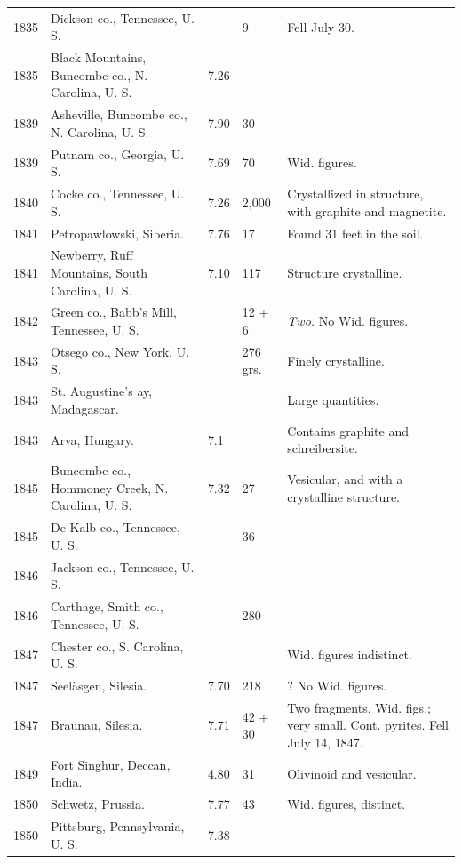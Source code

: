 \documentclass[a4paper, 12pt, oneside]{article}
\begin{document}
\begin{center}
\begin{longtable}{|p{16mm}|p{34mm}|p{10mm}|p{12mm}|p{40mm}|}
        1835 & Dickson co., Tennessee, U. S. & ~ & 9 & Fell July 30. \\
        1835 & Black Mountains, Buncombe co., N. Carolina, U. S. & 7.26 & ~ & ~ \\
        1839 & Asheville, Buncombe co., N. Carolina, U. S. & 7.90 & 30 & ~ \\
        1839 & Putnam co., Georgia, U. S. & 7.69 & 70 & Wid. figures. \\
        1840 & Cocke co., Tennessee, U. S. & 7.26 & 2,000 & Crystallized in structure, with graphite and magnetite. \\
        1841 & Petropawlowski, Siberia. & 7.76 & 17 & Found 31 feet in the soil. \\
        1841 & Newberry, Ruff Mountains, South Carolina, U. S. & 7.10 & 117 & Structure crystalline. \\
        1842 & Green co., Babb’s Mill, Tennessee, U. S. & ~ & 12 + 6 & \emph{Two.} No Wid. figures. \\
        1843 & Otsego co., New York, U. S. & ~ & 276 grs. & Finely crystalline. \\
        1843 & St. Augustine’s ay, Madagascar. & ~ & ~ & Large quantities. \\
        1843 & Arva, Hungary. & 7.1 & ~ & Contains graphite and schreibersite. \\
        1845 & Buncombe co., Hommoney Creek, N. Carolina, U. S. & 7.32 & 27 & Vesicular, and with a crystalline structure. \\
        1845 & De Kalb co., Tennessee, U. S. & ~ & 36 & ~ \\
        1846 & Jackson co., Tennessee, U. S. & ~ & ~ & ~ \\
        1846 & Carthage, Smith co., Tennessee, U. S. & ~ & 280 & ~ \\
        1847 & Chester co., S. Carolina, U. S. & ~ & ~ & Wid. figures indistinct. \\
        1847 & Seeläsgen, Silesia. & 7.70 & 218 & ? No Wid. figures. \\
        1847 & Braunau, Silesia. & 7.71 & 42 + 30 & Two fragments. Wid. figs.; very small. Cont. pyrites. Fell July 14, 1847. \\
        1849 & Fort Singhur, Deccan, India. & 4.80 & 31 & Olivinoid and vesicular. \\
        1850 & Schwetz, Prussia. & 7.77 & 43 & Wid. figures, distinct. \\
        1850 & Pittsburg, Pennsylvania, U. S. & 7.38 & ~ & ~ \\

\end{longtable}
\end{center}
\end{document}
